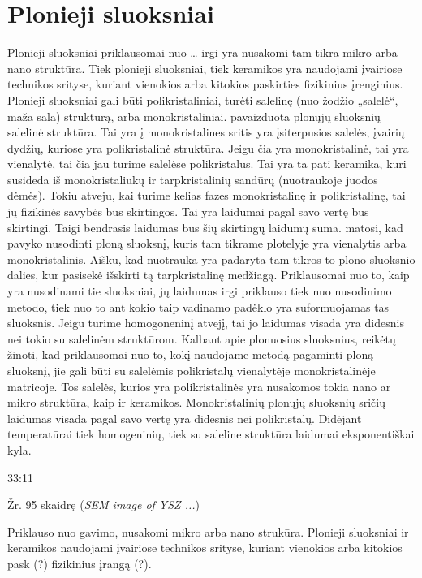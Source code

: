 \section{Plonieji sluoksniai}


Plonieji sluoksniai priklausomai nuo … irgi yra nusakomi tam tikra
mikro arba nano struktūra. Tiek plonieji sluoksniai, tiek keramikos
yra naudojami įvairiose technikos srityse, kuriant vienokios arba
kitokios paskirties fizikinius įrenginius.
Plonieji sluoksniai gali būti polikristaliniai, turėti salelinę
(nuo žodžio „salelė“, maža sala) struktūrą, arba monokristaliniai.
 pavaizduota plonųjų sluoksnių salelinė struktūra. Tai
yra į monokristalines sritis yra įsiterpusios salelės, įvairių dydžių,
kuriose yra polikristalinė struktūra. Jeigu čia yra monokristalinė,
tai yra vienalytė, tai čia jau turime salelėse polikristalus. Tai
yra ta pati keramika, kuri susideda iš monokristaliukų ir
tarpkristalinių sandūrų (nuotraukoje juodos dėmės). Tokiu atveju,
kai turime kelias fazes monokristalinę ir polikristalinę, tai jų
fizikinės savybės bus skirtingos. Tai yra laidumai pagal savo vertę
bus skirtingi. Taigi bendrasis laidumas bus šių skirtingų laidumų
suma.  matosi, kad pavyko nusodinti ploną sluoksnį, kuris
tam tikrame plotelyje yra vienalytis arba monokristalinis. Aišku,
kad nuotrauka yra padaryta tam tikros to plono sluoksnio dalies,
kur pasisekė išskirti tą tarpkristalinę medžiagą.
Priklausomai nuo to, kaip yra nusodinami tie sluoksniai, jų laidumas
irgi priklauso tiek nuo nusodinimo metodo, tiek nuo to ant kokio taip
vadinamo padėklo yra suformuojamas tas sluoksnis. Jeigu turime
homogoneninį atvejį, tai jo laidumas visada yra didesnis nei tokio su
salelinėm struktūrom. Kalbant apie plonuosius sluoksnius, reikėtų
žinoti, kad priklausomai nuo to, kokį naudojame metodą pagaminti
ploną sluoksnį, jie gali būti su salelėmis polikristalų vienalytėje
monokristalinėje matricoje. Tos salelės, kurios yra polikristalinės
yra nusakomos tokia nano ar mikro struktūra, kaip ir keramikos.
Monokristalinių plonųjų sluoksnių sričių laidumas visada pagal savo
vertę yra didesnis nei polikristalų. Didėjant temperatūrai tiek
homogeninių, tiek su saleline struktūra laidumai eksponentiškai
kyla.


33:11

Žr. 95 skaidrę (\textit{SEM image of YSZ ...})

Priklauso nuo gavimo, nusakomi mikro arba nano strukūra.
Plonieji sluoksniai ir keramikos naudojami įvairiose technikos srityse,
kuriant vienokios arba kitokios pask (?) fizikinius įrangą (?).

